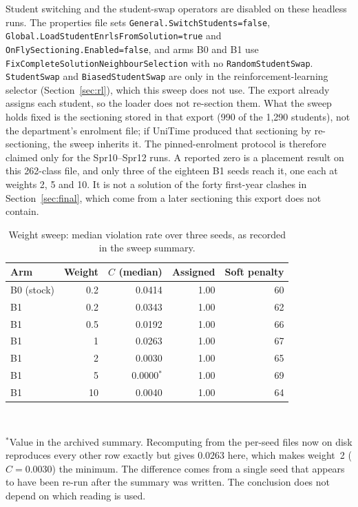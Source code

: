 \documentclass[journal]{IEEEtran}
\begin{document}
Student switching and the student-swap operators are disabled on these headless runs. The properties file sets \texttt{General.SwitchStudents=false}, \texttt{Global.LoadStudentEnrlsFromSolution=true} and \texttt{OnFlySectioning.Enabled=false}, and arms B0 and B1 use \texttt{FixCompleteSolutionNeighbourSelection} with no \texttt{RandomStudentSwap}. \texttt{StudentSwap} and \texttt{BiasedStudentSwap} are only in the reinforcement-learning selector (Section~\ref{sec:rl}), which this sweep does not use. The export already assigns each student, so the loader does not re-section them. What the sweep holds fixed is the sectioning stored in that export (990 of the 1{,}290 students), not the department's enrolment file; if UniTime produced that sectioning by re-sectioning, the sweep inherits it. The pinned-enrolment protocol is therefore claimed only for the Spr10--Spr12 runs. A reported zero is a placement result on this 262-class file, and only three of the eighteen B1 seeds reach it, one each at weights 2, 5 and 10. It is not a solution of the forty first-year clashes in Section~\ref{sec:final}, which come from a later sectioning this export does not contain.

\begin{table}[t]
\centering
\caption{Weight sweep: median violation rate over three seeds, as recorded in the sweep summary.}
\label{tab:sweep}
\footnotesize
\begin{tabular}{@{}lrrrr@{}}
\toprule
Arm & Weight & $C$ (median) & Assigned & Soft penalty \\
\midrule
B0 (stock) & 0.2 & 0.0414 & 1.00 & 60 \\
B1 & 0.2 & 0.0343 & 1.00 & 62 \\
B1 & 0.5 & 0.0192 & 1.00 & 66 \\
B1 & 1 & 0.0263 & 1.00 & 67 \\
B1 & 2 & 0.0030 & 1.00 & 65 \\
B1 & 5 & 0.0000$^{*}$ & 1.00 & 69 \\
B1 & 10 & 0.0040 & 1.00 & 64 \\
\bottomrule
\end{tabular}
\\[2pt]
\raggedright\footnotesize $^{*}$Value in the archived summary. Recomputing from the per-seed files now on disk reproduces every other row exactly but gives $0.0263$ here, which makes weight~2 ($C=0.0030$) the minimum. The difference comes from a single seed that appears to have been re-run after the summary was written. The conclusion does not depend on which reading is used.
\end{table}
\end{document}
